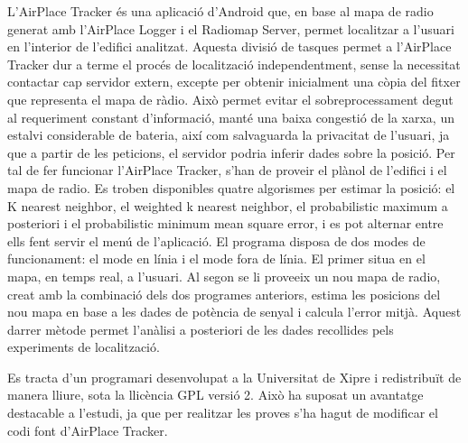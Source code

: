 L'AirPlace Tracker és una aplicació d'Android que, en base al mapa de radio generat amb l'AirPlace Logger i el Radiomap Server, permet localitzar a l'usuari en l'interior de l'edifici analitzat. Aquesta divisió de tasques permet a l'AirPlace Tracker dur a terme el procés de localització independentment, sense la necessitat contactar cap servidor extern, excepte per obtenir inicialment una còpia del fitxer que representa el mapa de ràdio. Això permet evitar el sobreprocessament degut al requeriment constant d'informació, manté una baixa congestió de la xarxa, un estalvi considerable de bateria, així com salvaguarda la privacitat de l'usuari, ja que a partir de les peticions, el servidor podria inferir dades sobre la posició.
Per tal de fer funcionar l'AirPlace Tracker, s'han de proveir el plànol de l'edifici i el mapa de radio. Es troben disponibles quatre algorismes per estimar la posició: el K nearest neighbor, el weighted k nearest neighbor, el probabilistic maximum a posteriori i el probabilistic minimum mean square error, i es pot alternar entre ells fent servir el menú de l'aplicació.
El programa disposa de dos modes de funcionament: el mode en línia i el mode fora de línia. El primer situa en el mapa, en temps real, a l'usuari. Al segon se li proveeix un nou mapa de radio, creat amb la combinació dels dos programes anteriors, estima les posicions del nou mapa en base a les dades de potència de senyal i calcula l'error mitjà. Aquest darrer mètode permet l'anàlisi a posteriori de les dades recollides pels experiments de localització.

Es tracta d'un programari desenvolupat a la Universitat de Xipre i redistribuït de manera lliure, sota la llicència GPL versió 2. Això ha suposat un avantatge destacable a l'estudi, ja que per realitzar les proves s'ha hagut de modificar el codi font d'AirPlace Tracker.


